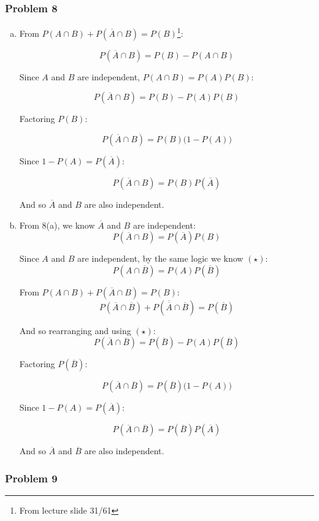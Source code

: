 \documentclass[11pt]{extarticle}
\begin{document}
\subsubsection*{Problem 8}
\begin{enumerate}[(a)]


\item From $P(A \cap B) + P(\overline{A} \cap B) = P(B)$\footnote{From lecture slide 31/61}:

$$P(\overline{A} \cap B) = P(B) - P(A \cap B)$$
 
Since $A$ and $B$ are independent, $P(A \cap B) = P(A) P(B)$:

$$P(\overline{A} \cap B) = P(B) - P(A)P(B)$$

Factoring $P(B)$:

$$P(\overline{A} \cap B) = P(B) \big(1 - P(A) \big)$$

Since $1-P(A) = P(\overline{A})$:

$$P(\overline{A} \cap B) = P(B) P(\overline{A})$$

And so $\overline{A}$ and $B$ are also independent. 




\item From 8(a), we know $\overline{A}$ and $B$ are independent: $$P(\overline{A} \cap B) = P(\overline{A}) P(B)$$

Since $A$ and $B$ are independent, by the same logic we know $(\star)$:$$P(A \cap \overline{B}) = P(A)P(\overline{B}) $$

From $P(A \cap B) + P(\overline{A} \cap B) = P(B)$:
$$P(\overline{A} \cap \overline{B}) + P(\overline{\overline{A}} \cap \overline{B}) = P(\overline{B})$$

And so rearranging and using $(\star)$:
$$P(\overline{A} \cap \overline{B}) = P(\overline{B}) - P(A)P(\overline{B})$$

Factoring $P(\overline{B})$:

$$P(\overline{A} \cap \overline{B}) = P(\overline{B}) \big(1 - P(A) \big)$$

Since $1-P(A) = P(\overline{A})$:

$$P(\overline{A} \cap \overline{B}) = P(\overline{B}) P(\overline{A})$$

And so $\overline{A}$ and $\overline{B}$ are also independent. 


\end{enumerate}

\subsubsection*{Problem 9}
\end{document}
